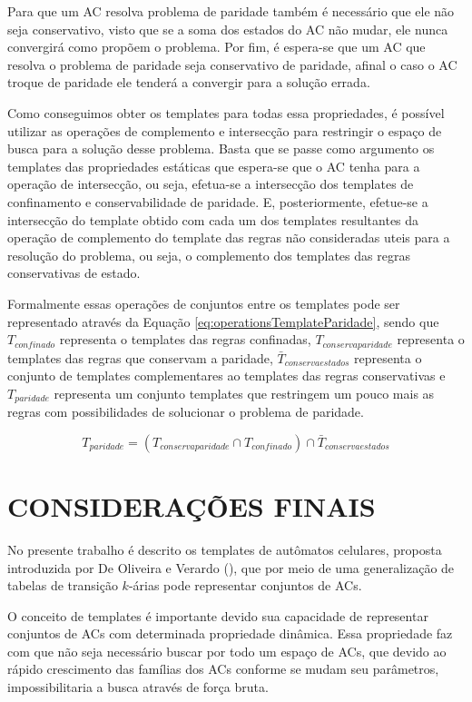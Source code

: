 \documentclass[12pt,a4paper]{article}
\let\stdsection\section
\renewcommand\section{\newpage\stdsection}
\begin{document}
	Para que um AC resolva problema de paridade também é necessário que ele não seja conservativo, visto que se a soma dos estados do AC não mudar, ele nunca convergirá como propõem o problema. Por fim, é espera-se que um AC que resolva o problema de paridade seja conservativo de paridade, afinal o caso o AC troque de paridade ele tenderá a convergir para a solução errada.

	Como conseguimos obter os templates para todas essa propriedades, é possível utilizar as operações de complemento e intersecção para restringir o espaço de busca para a solução desse problema. Basta que se passe como argumento os templates das propriedades estáticas que espera-se que o AC tenha para a operação de intersecção, ou seja, efetua-se a intersecção dos templates de confinamento e conservabilidade de paridade. E, posteriormente, efetue-se a intersecção do template obtido com cada um dos templates resultantes da operação de complemento do template das regras não consideradas uteis para a resolução do problema, ou seja, o complemento dos templates das regras conservativas de estado.

	Formalmente essas operações de conjuntos entre os templates pode ser representado através da Equação \ref{eq:operationsTemplateParidade}, sendo que $T_{confinado}$ representa o templates das regras confinadas, $T_{conservaparidade}$ representa o templates das regras que conservam a paridade, $\bar{T}_{conservaestados}$ representa o conjunto de templates complementares ao templates das regras conservativas e $T_{paridade}$ representa um conjunto templates que restringem um pouco mais as regras com possibilidades de solucionar o problema de paridade.

	\begin{equation}
	T_{paridade} = (T_{conservaparidade} \cap T_{confinado}) \cap \bar{T}_{conservaestados}
	\label{eq:operationsTemplateParidade}
	\end{equation}

\section{CONSIDERAÇÕES FINAIS}\label{sec:conclusao}%
No presente trabalho é descrito os templates de autômatos celulares, proposta introduzida por De Oliveira e Verardo (\citeyear{deOliveira2014}), que por meio de uma generalização de tabelas de transição $k$-árias pode representar conjuntos de ACs.

O conceito de templates é importante devido sua capacidade de representar conjuntos de ACs com determinada propriedade dinâmica. Essa propriedade faz com que não seja necessário buscar por todo um espaço de ACs, que devido ao rápido crescimento das famílias dos ACs conforme se mudam seu parâmetros, impossibilitaria a busca através de força bruta.
\end{document}
